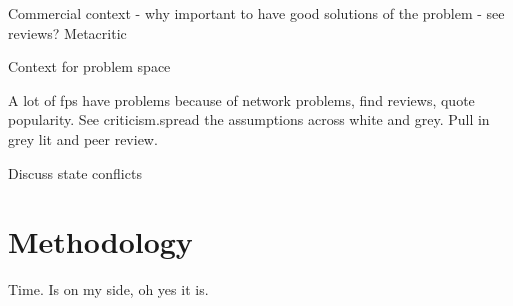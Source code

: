 \documentclass[journal]{IEEEtran}
\begin{document}
Commercial context - why important to have good solutions of the problem - see reviews? Metacritic

Context for problem space

A lot of fps have problems because of network problems, find reviews, quote popularity. See criticism.spread the assumptions across white and grey. Pull in grey lit and peer review. \cite{solaire2016reddit} \cite{hp2015bungie}


Discuss state conflicts





\section{Methodology}

Time. Is on my side, oh yes it is.








\end{document}
